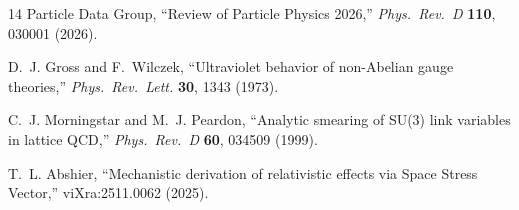 \documentclass[11pt,a4paper]{article}
\begin{document}
\begin{thebibliography}{14}
Particle Data Group,
``Review of Particle Physics 2026,''
\textit{Phys.\ Rev.\ D} \textbf{110}, 030001 (2026).

D.~J. Gross and F.~Wilczek,
``Ultraviolet behavior of non-Abelian gauge theories,''
\textit{Phys.\ Rev.\ Lett.} \textbf{30}, 1343 (1973).

C.~J. Morningstar and M.~J. Peardon,
``Analytic smearing of SU(3) link variables in lattice QCD,''
\textit{Phys.\ Rev.\ D} \textbf{60}, 034509 (1999).

T.~L. Abshier,
``Mechanistic derivation of relativistic effects via Space Stress Vector,''
viXra:2511.0062 (2025).

\end{thebibliography}
\end{document}
